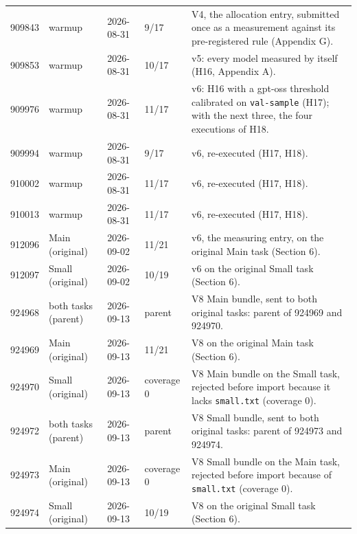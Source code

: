 {\begin{longtable}{L{1.3cm}L{1.9cm}L{1.7cm}L{1.5cm}L{5.9cm}}
909843 & warmup & 2026-08-31 & 9/17 & V4, the allocation entry, submitted once as a measurement against its pre-registered rule (Appendix G). \\

909853 & warmup & 2026-08-31 & 10/17 & v5: every model measured by itself (H16, Appendix A). \\

909976 & warmup & 2026-08-31 & 11/17 & v6: H16 with a gpt-oss threshold calibrated on \texttt{val-sample} (H17); with the next three, the four executions of H18. \\

909994 & warmup & 2026-08-31 & 9/17 & v6, re-executed (H17, H18). \\

910002 & warmup & 2026-08-31 & 11/17 & v6, re-executed (H17, H18). \\

910013 & warmup & 2026-08-31 & 11/17 & v6, re-executed (H17, H18). \\

912096 & Main (original) & 2026-09-02 & 11/21 & v6, the measuring entry, on the original Main task (Section 6). \\

912097 & Small (original) & 2026-09-02 & 10/19 & v6 on the original Small task (Section 6). \\

924968 & both tasks (parent) & 2026-09-13 & parent & V8 Main bundle, sent to both original tasks: parent of 924969 and 924970. \\

924969 & Main (original) & 2026-09-13 & 11/21 & V8 on the original Main task (Section 6). \\

924970 & Small (original) & 2026-09-13 & coverage 0 & V8 Main bundle on the Small task, rejected before import because it lacks \texttt{small.txt} (coverage 0). \\

924972 & both tasks (parent) & 2026-09-13 & parent & V8 Small bundle, sent to both original tasks: parent of 924973 and 924974. \\

924973 & Main (original) & 2026-09-13 & coverage 0 & V8 Small bundle on the Main task, rejected before import because of \texttt{small.txt} (coverage 0). \\

924974 & Small (original) & 2026-09-13 & 10/19 & V8 on the original Small task (Section 6). \\


\end{longtable}}
